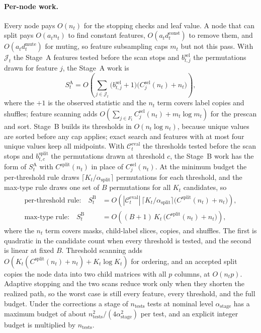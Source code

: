 \paragraph{Per-node work.}
Every node pays $O(n_t)$ for the stopping checks and leaf value. A node that can
split pays $O(a_t n_t)$ to find constant features, $O(a_t d_t^{\mathrm{const}})$
to remove them, and $O(a_t d_t^{\mathrm{mute}})$ for muting, so feature
subsampling caps $m_t$ but not this pass. With $\mathcal{J}_t$ the Stage~A
features tested before the scan stops and $b^{\mathrm{sel}}_{t,j}$ the
permutations drawn for feature $j$, the Stage~A work is
\begin{equation}
  S^{\mathrm{A}}_t
  = O\!\left(\sum_{j \in \mathcal{J}_t}
      \bigl(b^{\mathrm{sel}}_{t,j}+1\bigr)
      \bigl(C^{\mathrm{sel}}_j(n_t)+n_t\bigr)\right),
\end{equation}
where the $+1$ is the observed statistic and the $n_t$ term covers label copies
and shuffles; feature scanning adds
$O(\sum_{j\in F_t} C^{\mathrm{sel}}_j(n_t) + m_t\log m_t)$ for the prescan and
sort. Stage~B builds its thresholds in $O(n_t\log n_t)$, because unique values
are sorted before any cap applies; exact search and features with at most four
unique values keep all midpoints. With $\mathcal{C}^{\mathrm{eval}}_t$ the
thresholds tested before the scan stops and $b^{\mathrm{split}}_{t,c}$ the
permutations drawn at threshold $c$, the Stage~B work has the form of
$S^{\mathrm{A}}_t$ with $C^{\mathrm{split}}(n_t)$ in place of
$C^{\mathrm{sel}}_j(n_t)$. At the minimum budget the per-threshold rule draws
$\lceil K_t/\alpha_{\mathrm{split}}\rceil$ permutations for each threshold,
and the max-type rule draws one set of $B$ permutations for all $K_t$
candidates, so
\begin{align*}
  \text{per-threshold rule:}\quad S^{\mathrm{B}}_t
  &= O\!\left(|\mathcal{C}^{\mathrm{eval}}_t|\,
      \lceil K_t/\alpha_{\mathrm{split}}\rceil
      \bigl(C^{\mathrm{split}}(n_t)+n_t\bigr)\right),\\
  \text{max-type rule:}\quad S^{\mathrm{B}}_t
  &= O\!\left((B+1)\,K_t\,\bigl(C^{\mathrm{split}}(n_t)+n_t\bigr)\right),
\end{align*}
where the $n_t$ term covers masks, child-label slices, copies, and shuffles.
The first is quadratic in the candidate count when every threshold is tested,
and the second is linear at fixed $B$. Threshold scanning adds
$O(K_t(C^{\mathrm{split}}(n_t)+n_t) + K_t\log K_t)$ for ordering, and an
accepted split copies the node data into two child matrices with all $p$
columns, at $O(n_t p)$. Adaptive stopping and the two scans reduce work only
when they shorten the realized path, so the worst case is still every feature,
every threshold, and the full budget. Under the corrections a stage of
$n_{\mathrm{tests}}$ tests at nominal level $\alpha_{\mathrm{stage}}$ has a
maximum budget of about $n_{\mathrm{tests}}^2/(4\alpha_{\mathrm{stage}}^2)$ per
test, and an explicit integer budget is multiplied by $n_{\mathrm{tests}}$.

